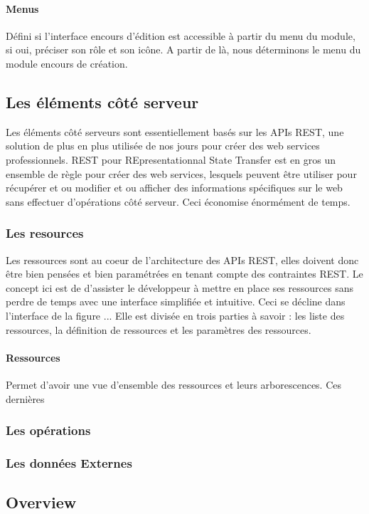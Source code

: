 \documentclass[a4paper,12pt]{article}
\begin{document}
\paragraph{Menus}
Défini si l'interface encours d'édition est accessible à partir du menu du module,
si oui, préciser son rôle et son icône. A partir de là, nous déterminons le menu 
du module encours de création. 

\subsection{Les éléments côté serveur}
Les éléments côté serveurs sont  essentiellement  basés sur les APIs REST,
une solution de plus en plus utilisée de nos jours pour créer des web services professionnels.
REST pour REpresentationnal  State Transfer est en gros  un ensemble de règle pour créer des web services,
lesquels peuvent être utiliser pour récupérer et ou modifier et ou afficher  des informations spécifiques sur le web
sans effectuer d'opérations côté serveur. Ceci économise  énormément de temps.
\subsubsection{Les resources}
 Les ressources  sont au coeur de l'architecture des APIs REST, elles doivent donc être
 bien pensées et bien paramétrées en tenant compte des contraintes REST. Le concept ici est de
 d'assister le développeur à mettre en place ses ressources sans perdre de temps avec une interface simplifiée
 et intuitive. Ceci se décline dans l'interface de la figure ... Elle est divisée en trois parties à savoir : les liste des
 ressources, la définition de ressources et les paramètres des ressources.
 \paragraph{Ressources}
 Permet d'avoir une vue d'ensemble des ressources et leurs arborescences. Ces dernières 

\subsubsection{Les opérations}
\subsubsection{Les données Externes}%

\subsection{Overview}
\end{document}

